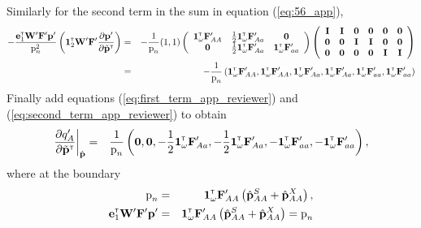 \documentclass[11pt]{article}
\newcommand{\bo}[1]{{\bf #1}}
\newcommand{\tr}{{\mbox{\tiny \sf T}}}
\begin{document}
\begin{landscape}
Similarly for the second term in the sum in equation (\ref{eq:56_app}),
\begin{eqnarray}
	- \frac{\mathbf{e}_1^\tr \mathbf{W}^\prime \mathbf{F}^\prime \mathbf{p}^\prime}{ \mbox{p}_{n}^2} \left( \mathbf{1}^\tr_{2}\mathbf{W}^\prime\mathbf{F}^\prime \frac{\partial  \mathbf{p}^\prime}{\partial \tilde{\bo p}^\tr} \right) &=& -\frac{1}{ \mbox{p}_{n}}(1,1) \left(\begin{array} {ccc}
\mathbf{1}^\tr_{\omega} \mathbf{F}_{AA}^\prime& \frac{1}{2}\mathbf{1}^\tr_{\omega} \mathbf{F}_{Aa}^\prime &\mathbf{0} \\
\mathbf{0} &\frac{1}{2}\mathbf{1}^\tr_{\omega} \mathbf{F}_{Aa}^\prime & \mathbf{1}^\tr_{\omega} \mathbf{F}_{aa}^\prime
\end{array}\right) \left(\begin{array} {cccccc}
\mathbf{I}& \mathbf{I}& \mathbf{0}  &\mathbf{0} &\mathbf{0}  &\mathbf{0} \\
\mathbf{0} &\mathbf{0}  &\mathbf{I}& \mathbf{I}& \mathbf{0} &\mathbf{0} \\
\mathbf{0} &\mathbf{0}  &\mathbf{0} &\mathbf{0}  &  \mathbf{I}& \mathbf{I}
\end{array}\right) \nonumber \\
 &=& -\frac{1}{ \mbox{p}_{n}} \left( \mathbf{1}^\tr_{\omega} \mathbf{F}_{AA}^\prime, \mathbf{1}^\tr_{\omega} \mathbf{F}_{AA}^\prime , \mathbf{1}^\tr_{\omega} \mathbf{F}_{Aa}^\prime, \mathbf{1}^\tr_{\omega} \mathbf{F}_{Aa}^\prime, \mathbf{1}^\tr_{\omega} \mathbf{F}_{aa}^\prime , \mathbf{1}^\tr_{\omega} \mathbf{F}_{aa}^\prime  \right) \label{eq:second_term_app_reviewer}
\end{eqnarray}
Finally add equations (\ref{eq:first_term_app_reviewer}) and (\ref{eq:second_term_app_reviewer}) to obtain
\begin{eqnarray}
  \frac{\partial   q^\prime_A }{\partial \tilde{\bo p}^\tr}\bigg\rvert_{\hat{\bo p}}&=& \frac{1}{ \mbox{p}_{n}} \left( \mathbf{0}, \mathbf{0}, -\frac{1}{2}\mathbf{1}^\tr_{\omega} \mathbf{F}_{Aa}^\prime, -\frac{1}{2}\mathbf{1}^\tr_{\omega} \mathbf{F}_{Aa}^\prime, -\mathbf{1}^\tr_{\omega} \mathbf{F}_{aa}^\prime, -\mathbf{1}^\tr_{\omega} \mathbf{F}_{aa}^\prime  \right) \label{eq:79_app},
\end{eqnarray}
where at the boundary
\begin{eqnarray}
  \mbox{p}_{n}&=&\mathbf{1}^\tr_\omega \mathbf{F}_{AA}^\prime \left( \hat{\mathbf{p}}^S_{AA}+\hat{\mathbf{p}}^X_{AA} \right), \\
  \mathbf{e}_1^\tr \mathbf{W}^\prime \mathbf{F}^\prime \mathbf{p}^\prime&=&\mathbf{1}^\tr_\omega \mathbf{F}_{AA}^\prime \left( \hat{\mathbf{p}}^S_{AA}+\hat{\mathbf{p}}^X_{AA} \right)=  \mbox{p}_{n}
\end{eqnarray}



\end{landscape}
\end{document}
